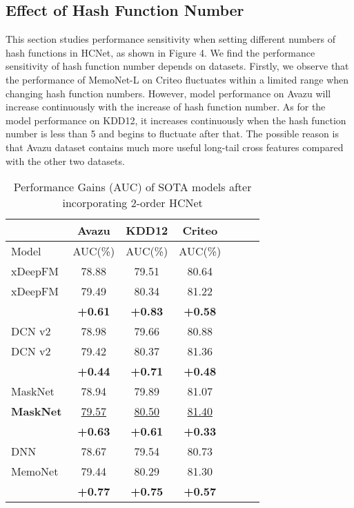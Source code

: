 \documentclass[sigconf,authorversion]{acmart}
\begin{document}
\subsection{Effect of Hash Function Number}
This section studies performance sensitivity when setting different numbers of hash functions in HCNet, as shown in Figure 4. We find the performance sensitivity of hash function number depends on datasets. Firstly, we observe that the performance of MemoNet-L on Criteo fluctuates within a limited range when changing hash function numbers. However, model performance on Avazu will increase continuously with the increase of hash function number. As for the model performance on KDD12, it increases continuously when the hash function number is less than 5 and begins to fluctuate after that. The possible reason is that Avazu dataset contains much more useful long-tail cross features compared with the other two datasets.


\begin{table}
\centering
\caption{Performance Gains (AUC) of SOTA models after incorporating 2-order HCNet}
\begin{tabular}{l|cccccc}
\toprule
  & \multicolumn{1}{c}{\textbf{Avazu}}  & \multicolumn{1}{c}{\textbf{KDD12} } & \multicolumn{1}{c}{\textbf{Criteo}} \\
\midrule
Model & AUC(\%)   & AUC(\%)   & AUC(\%)    \\
\midrule
xDeepFM       & 78.88    &  79.51  & 80.64    \\
 xDeepFM       & 79.49    & 80.34  & 81.22    \\
\quad \quad           & \textbf{+0.61}  &\textbf{+0.83} &\textbf{+0.58}  \\
 \midrule 
 DCN v2       & 78.98    &  79.66  & 80.88    \\
 DCN v2       & 79.42    & 80.37  & 81.36    \\
\quad \quad           & \textbf{+0.44}  &\textbf{+0.71} &\textbf{+0.48}  \\
 \midrule 
MaskNet       & 78.94    &  79.89  & 81.07    \\
\textbf{MaskNet  }     & \underline{79.57}   & \underline{80.50}  & \underline{81.40}    \\
\quad\quad            & \textbf{+0.63}  &\textbf{+0.61} &\textbf{+0.33}  \\
 \midrule 
 \midrule 
DNN       & 78.67    &  79.54  & 80.73    \\
MemoNet       & 79.44    & 80.29  & 81.30    \\
\quad\quad            & \textbf{+0.77}  &\textbf{+0.75} &\textbf{+0.57}  \\
 

\bottomrule
\end{tabular}\label{tab:performancegains}
\end{table}
\end{document}
